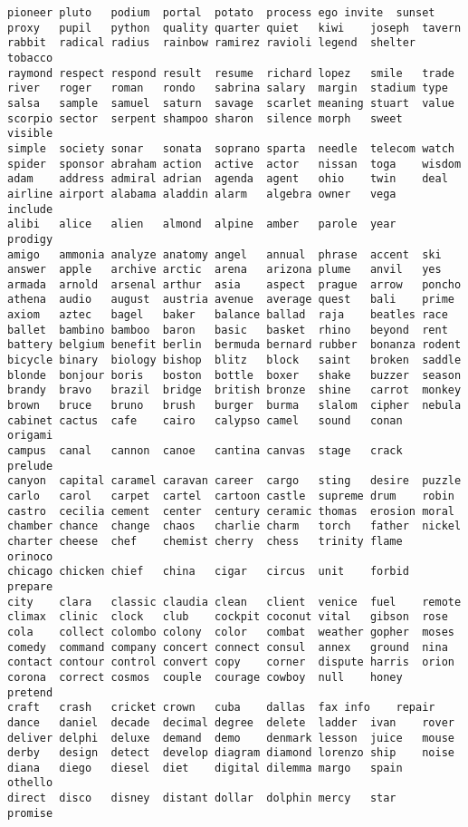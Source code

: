 \begin{verbatim}
pioneer	pluto	podium	portal	potato	process	ego	invite	sunset
proxy	pupil	python	quality	quarter	quiet	kiwi	joseph	tavern
rabbit	radical	radius	rainbow	ramirez	ravioli	legend	shelter	tobacco
raymond	respect	respond	result	resume	richard	lopez	smile	trade
river	roger	roman	rondo	sabrina	salary	margin	stadium	type
salsa	sample	samuel	saturn	savage	scarlet	meaning	stuart	value
scorpio	sector	serpent	shampoo	sharon	silence	morph	sweet	visible
simple	society	sonar	sonata	soprano	sparta	needle	telecom	watch
spider	sponsor	abraham	action	active	actor	nissan	toga	wisdom
adam	address	admiral	adrian	agenda	agent	ohio	twin	deal
airline	airport	alabama	aladdin	alarm	algebra	owner	vega	include
alibi	alice	alien	almond	alpine	amber	parole	year	prodigy
amigo	ammonia	analyze	anatomy	angel	annual	phrase	accent	ski
answer	apple	archive	arctic	arena	arizona	plume	anvil	yes
armada	arnold	arsenal	arthur	asia	aspect	prague	arrow	poncho
athena	audio	august	austria	avenue	average	quest	bali	prime
axiom	aztec	bagel	baker	balance	ballad	raja	beatles	race
ballet	bambino	bamboo	baron	basic	basket	rhino	beyond	rent
battery	belgium	benefit	berlin	bermuda	bernard	rubber	bonanza	rodent
bicycle	binary	biology	bishop	blitz	block	saint	broken	saddle
blonde	bonjour	boris	boston	bottle	boxer	shake	buzzer	season
brandy	bravo	brazil	bridge	british	bronze	shine	carrot	monkey
brown	bruce	bruno	brush	burger	burma	slalom	cipher	nebula
cabinet	cactus	cafe	cairo	calypso	camel	sound	conan	origami
campus	canal	cannon	canoe	cantina	canvas	stage	crack	prelude
canyon	capital	caramel	caravan	career	cargo	sting	desire	puzzle
carlo	carol	carpet	cartel	cartoon	castle	supreme	drum	robin
castro	cecilia	cement	center	century	ceramic	thomas	erosion	moral
chamber	chance	change	chaos	charlie	charm	torch	father	nickel
charter	cheese	chef	chemist	cherry	chess	trinity	flame	orinoco
chicago	chicken	chief	china	cigar	circus	unit	forbid	prepare
city	clara	classic	claudia	clean	client	venice	fuel	remote
climax	clinic	clock	club	cockpit	coconut	vital	gibson	rose
cola	collect	colombo	colony	color	combat	weather	gopher	moses
comedy	command	company	concert	connect	consul	annex	ground	nina
contact	contour	control	convert	copy	corner	dispute	harris	orion
corona	correct	cosmos	couple	courage	cowboy	null	honey	pretend
craft	crash	cricket	crown	cuba	dallas	fax	info	repair
dance	daniel	decade	decimal	degree	delete	ladder	ivan	rover
deliver	delphi	deluxe	demand	demo	denmark	lesson	juice	mouse
derby	design	detect	develop	diagram	diamond	lorenzo	ship	noise
diana	diego	diesel	diet	digital	dilemma	margo	spain	othello
direct	disco	disney	distant	dollar	dolphin	mercy	star	promise

\end{verbatim}
